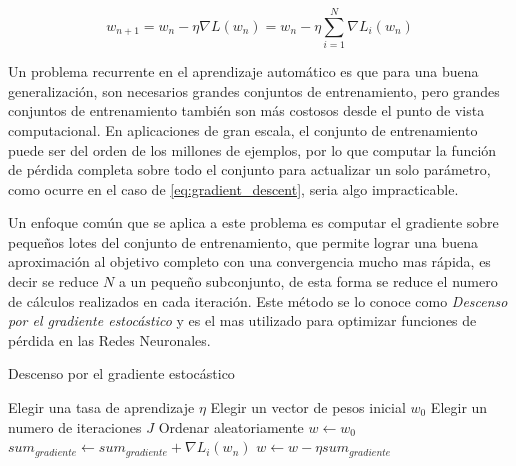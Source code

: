 \documentclass[a4paper,11pt,spanish]{book}
\begin{document}
      \begin{equation}\label{eq:gradient_descent}
	w_{n+1} = w_n - \eta \nabla L(w_n)  = w_n - \eta \sum_{i=1}^{N} \nabla L_i(w_n)
      \end{equation}

      Un problema recurrente en el aprendizaje automático es que para una buena generalización, son necesarios grandes conjuntos de entrenamiento,
      pero grandes conjuntos de entrenamiento también son más costosos desde el punto de vista computacional.
      En aplicaciones de gran escala, el conjunto de entrenamiento puede ser del orden de los millones de ejemplos, por lo que computar la función de
      pérdida completa sobre todo el conjunto para actualizar un solo parámetro, como ocurre en el caso de \eqref{eq:gradient_descent}, seria algo impracticable.
      
      Un enfoque común que se aplica a este problema es computar el gradiente sobre pequeños lotes del conjunto de entrenamiento,
      que permite lograr una buena aproximación al objetivo completo con una convergencia mucho mas rápida, es decir se reduce $N$ a un pequeño subconjunto, de esta forma se
      reduce el numero de cálculos realizados en cada iteración. Este método se lo conoce como \emph{Descenso por el gradiente estocástico} y es el mas utilizado para optimizar
      funciones de pérdida en las Redes Neuronales.

	\begin{algorithm}[ht]
	  \caption{Descenso por el gradiente estocástico}
	  \label{SGD}
	  \begin{algorithmic}
	    \State Elegir una tasa de aprendizaje $\eta$
	    \State Elegir un vector de pesos inicial $w_0$
	    \State Elegir un numero de iteraciones $J$
	    \State Ordenar aleatoriamente
	    \State $w \gets w_0$
		$sum_{gradiente} \gets sum_{gradiente} + \nabla L_i(w_n)$
	      \EndFor
	      \State $w \gets w - \eta sum_{gradiente}$
	    \EndFor
	  \end{algorithmic}
	\end{algorithm}
\iffalse
\end{document}
